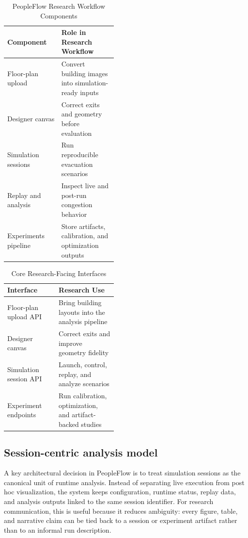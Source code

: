 \documentclass[conference]{IEEEtran}
\begin{document}
\begin{table}[htbp]
\caption{PeopleFlow Research Workflow Components}
\label{tab:components}
\centering
\begin{tabular}{>{\raggedright\arraybackslash}p{0.18\linewidth} >{\raggedright\arraybackslash}p{0.27\linewidth}}
\toprule
Component & Role in Research Workflow \\
\midrule
Floor-plan upload & Convert building images into simulation-ready inputs \\
Designer canvas & Correct exits and geometry before evaluation \\
Simulation sessions & Run reproducible evacuation scenarios \\
Replay and analysis & Inspect live and post-run congestion behavior \\
Experiments pipeline & Store artifacts, calibration, and optimization outputs \\
\bottomrule
\end{tabular}
\end{table}

\begin{table}[htbp]
\caption{Core Research-Facing Interfaces}
\label{tab:interfaces}
\centering
\begin{tabular}{>{\raggedright\arraybackslash}p{0.20\linewidth} >{\raggedright\arraybackslash}p{0.25\linewidth}}
\toprule
Interface & Research Use \\
\midrule
Floor-plan upload API & Bring building layouts into the analysis pipeline \\
Designer canvas & Correct exits and improve geometry fidelity \\
Simulation session API & Launch, control, replay, and analyze scenarios \\
Experiment endpoints & Run calibration, optimization, and artifact-backed studies \\
\bottomrule
\end{tabular}
\end{table}

\subsection{Session-centric analysis model}

A key architectural decision in PeopleFlow is to treat simulation sessions as the canonical unit of runtime analysis. Instead of separating live execution from post hoc visualization, the system keeps configuration, runtime status, replay data, and analysis outputs linked to the same session identifier. For research communication, this is useful because it reduces ambiguity: every figure, table, and narrative claim can be tied back to a session or experiment artifact rather than to an informal run description.
\end{document}
